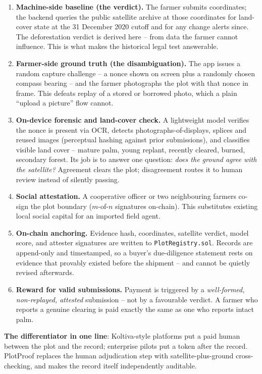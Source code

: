 \documentclass[11pt]{article}
\begin{document}
\begin{enumerate}[leftmargin=1.4em]
  \item \textbf{Machine-side baseline (the verdict).} The farmer submits coordinates; the backend queries the public satellite archive at those coordinates for land-cover state at the 31 December 2020 cutoff and for any change alerts since. The deforestation verdict is derived here -- from data the farmer cannot influence. This is what makes the historical legal test answerable.
  \item \textbf{Farmer-side ground truth (the disambiguation).} The app issues a random capture challenge -- a nonce shown on screen plus a randomly chosen compass bearing -- and the farmer photographs the plot with that nonce in frame. This defeats replay of a stored or borrowed photo, which a plain ``upload a picture'' flow cannot.
  \item \textbf{On-device forensic and land-cover check.} A lightweight model verifies the nonce is present via OCR, detects photographs-of-displays, splices and reused images (perceptual hashing against prior submissions), and classifies visible land cover -- mature palm, young replant, recently cleared, burned, secondary forest. Its job is to answer one question: \emph{does the ground agree with the satellite?} Agreement clears the plot; disagreement routes it to human review instead of silently passing.
  \item \textbf{Social attestation.} A cooperative officer or two neighbouring farmers co-sign the plot boundary ($m$-of-$n$ signatures on-chain). This substitutes existing local social capital for an imported field agent.
  \item \textbf{On-chain anchoring.} Evidence hash, coordinates, satellite verdict, model score, and attester signatures are written to \texttt{PlotRegistry.sol}. Records are append-only and timestamped, so a buyer's due-diligence statement rests on evidence that provably existed before the shipment -- and cannot be quietly revised afterwards.
  \item \textbf{Reward for valid submissions.} Payment is triggered by a \emph{well-formed, non-replayed, attested} submission -- not by a favourable verdict. A farmer who reports a genuine clearing is paid exactly the same as one who reports intact palm.
\end{enumerate}

\noindent\textbf{The differentiator in one line}: Koltiva-style platforms put a paid human between the plot and the record; enterprise pilots put a token after the record. PlotProof replaces the human adjudication step with satellite-plus-ground cross-checking, and makes the record itself independently auditable.
\end{document}
